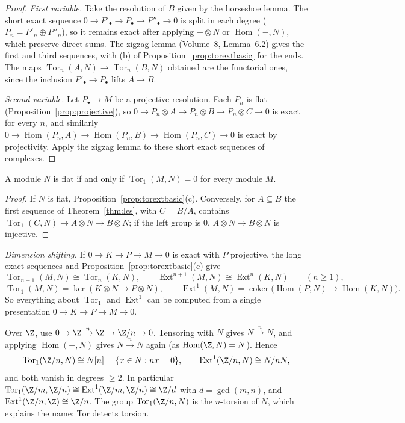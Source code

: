 \begin{proof}
\emph{First variable.} Take the resolution of $B$ given by the horseshoe lemma. The short exact sequence $0\to P'_\bullet\to P_\bullet\to P''_\bullet\to0$ is split in each degree ($P_n=P'_n\oplus P''_n$), so it remains exact after
applying $-\otimes N$ or $\operatorname{Hom}(-,N)$, which preserve direct sums. The zigzag lemma (Volume~8, Lemma~6.2) gives the first and third sequences, with (b) of Proposition~\ref{prop:torextbasic} for the ends. The maps
$\operatorname{Tor}_n(A,N)\to\operatorname{Tor}_n(B,N)$ obtained are the functorial ones, since the inclusion $P'_\bullet\to P_\bullet$ lifts $A\to B$.

\emph{Second variable.} Let $P_\bullet\to M$ be a projective resolution. Each $P_n$ is flat (Proposition~\ref{prop:projective}), so $0\to P_n\otimes A\to P_n\otimes B\to P_n\otimes C\to0$ is exact for every $n$, and similarly
$0\to\operatorname{Hom}(P_n,A)\to\operatorname{Hom}(P_n,B)\to\operatorname{Hom}(P_n,C)\to0$ is exact by projectivity. Apply the zigzag lemma to these short exact sequences of complexes.
\end{proof}

\begin{corollary}\label{cor:torflat}
A module $N$ is flat if and only if $\operatorname{Tor}_1(M,N)=0$ for every module $M$.
\end{corollary}

\begin{proof}
If $N$ is flat, Proposition~\ref{prop:torextbasic}(c). Conversely, for $A\subseteq B$ the first sequence of Theorem~\ref{thm:les}, with $C=B/A$, contains $\operatorname{Tor}_1(C,N)\to A\otimes N\to B\otimes N$; if the left group is $0$,
$A\otimes N\to B\otimes N$ is injective.
\end{proof}

\emph{Dimension shifting.} If $0\to K\to P\to M\to0$ is exact with $P$ projective, the long exact sequences and Proposition~\ref{prop:torextbasic}(c) give
\[
\operatorname{Tor}_{n+1}(M,N)\cong\operatorname{Tor}_n(K,N),\qquad\operatorname{Ext}^{n+1}(M,N)\cong\operatorname{Ext}^n(K,N)\qquad(n\ge1),
\]
\[
\operatorname{Tor}_1(M,N)=\ker(K\otimes N\to P\otimes N),\qquad\operatorname{Ext}^1(M,N)=\operatorname{coker}\bigl(\operatorname{Hom}(P,N)\to\operatorname{Hom}(K,N)\bigr).
\]
So everything about $\operatorname{Tor}_1$ and $\operatorname{Ext}^1$ can be computed from a single presentation $0\to K\to P\to M\to0$.

\begin{example}\label{ex:torextz}
Over $\Z$, use $0\to\Z\xrightarrow n\Z\to\Z/n\to0$. Tensoring with $N$ gives $N\xrightarrow nN$, and applying $\operatorname{Hom}(-,N)$ gives $N\xrightarrow nN$ again (as $\operatorname{Hom}(\Z,N)=N$). Hence
\[
\operatorname{Tor}_1(\Z/n,N)\cong N[n]=\{x\in N:nx=0\},\qquad\operatorname{Ext}^1(\Z/n,N)\cong N/nN,
\]
and both vanish in degrees $\ge2$. In particular $\operatorname{Tor}_1(\Z/m,\Z/n)\cong\operatorname{Ext}^1(\Z/m,\Z/n)\cong\Z/d$ with $d=\gcd(m,n)$, and $\operatorname{Ext}^1(\Z/n,\Z)\cong\Z/n$. The group
$\operatorname{Tor}_1(\Z/n,N)$ is the $n$-torsion of $N$, which explains the name: Tor detects torsion.
\end{example}

